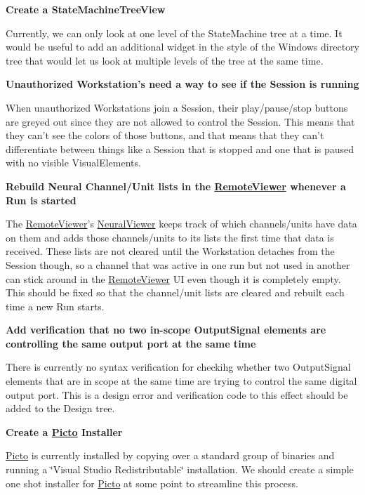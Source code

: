 {\bfseries Create a State\-Machine\-Tree\-View}\par
 Currently, we can only look at one level of the State\-Machine tree at a time. It would be useful to add an additional widget in the style of the Windows directory tree that would let us look at multiple levels of the tree at the same time.

{\bfseries Unauthorized Workstation's need a way to see if the Session is running}\par
 When unauthorized Workstations join a Session, their play/pause/stop buttons are greyed out since they are not allowed to control the Session. This means that they can't see the colors of those buttons, and that means that they can't differentiate between things like a Session that is stopped and one that is paused with no visible Visual\-Elements.

{\bfseries Rebuild Neural Channel/\-Unit lists in the \hyperlink{class_remote_viewer}{Remote\-Viewer} whenever a Run is started}\par
 The \hyperlink{class_remote_viewer}{Remote\-Viewer}'s \hyperlink{class_neural_viewer}{Neural\-Viewer} keeps track of which channels/units have data on them and adds those channels/units to its lists the first time that data is received. These lists are not cleared until the Workstation detaches from the Session though, so a channel that was active in one run but not used in another can stick around in the \hyperlink{class_remote_viewer}{Remote\-Viewer} U\-I even though it is completely empty. This should be fixed so that the channel/unit lists are cleared and rebuilt each time a new Run starts.

{\bfseries Add verification that no two in-\/scope Output\-Signal elements are controlling the same output port at the same time}\par
 There is currently no syntax verification for checkihg whether two Output\-Signal elements that are in scope at the same time are trying to control the same digital output port. This is a design error and verification code to this effect should be added to the Design tree.

{\bfseries Create a \hyperlink{namespace_picto}{Picto} Installer}\par
 \hyperlink{namespace_picto}{Picto} is currently installed by copying over a standard group of binaries and running a \char`\"{}\-Visual Studio Redistributable\char`\"{} installation. We should create a simple one shot installer for \hyperlink{namespace_picto}{Picto} at some point to streamline this process.

